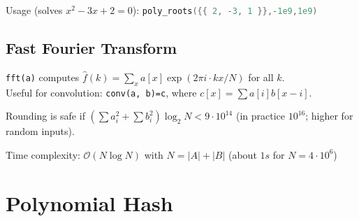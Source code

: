\documentclass{article}
\begin{document}
Usage (solves $x^2-3x+2 = 0$): \lstinline[language=C++]|poly_roots({{ 2, -3, 1 }},-1e9,1e9)|



\subsection*{Fast Fourier Transform}
\lstinline{fft(a)} computes $\hat f(k) = \sum_x a[x] \exp(2\pi i \cdot k x / N)$ for all $k$.\\
Useful for convolution: \lstinline{conv(a, b)=c}, where $c[x] = \sum a[i]b[x-i]$.

Rounding is safe if $(\sum a_i^2 + \sum b_i^2)\log_2{N} < 9\cdot10^{14}$
(in practice $10^{16}$; higher for random inputs).

Time complexity: $\mathcal{O}(N \log N)$ with $N = |A|+|B|$ (about $1s$ for $N=4 \cdot 10^6$)


\section*{Polynomial Hash}

\end{document}
